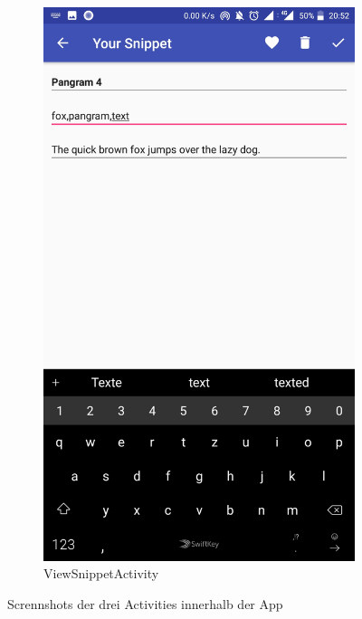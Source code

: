 \documentclass[11pt]{article}
\begin{document}
\begin{figure}
				\begin{subfigure}[b]{0.3\textwidth}
					\includegraphics[width=\textwidth]{Konzepte/screenshots/edit_snippet.jpg}
					\caption{ViewSnippetActivity}
				\end{subfigure}
				\caption{Scrennshots der drei Activities innerhalb der App}
				\label{fig:activities}
			\end{figure}
		
\end{document}
